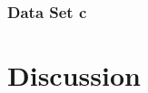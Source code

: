 \documentclass[acmsmall,nonacm]{acmart}
\begin{document}
\subsubsection{Data Set c}


\section{Discussion}

%


\pagebreak  




\end{document}
